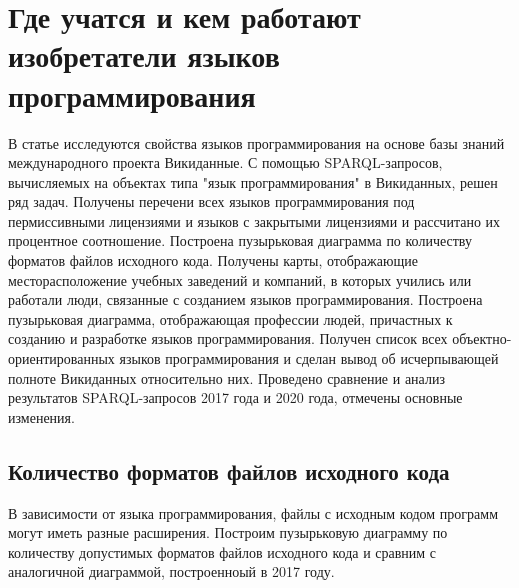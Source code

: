 \chapter{Где учатся и кем работают изобретатели языков программирования}
\label{ch:programming languages}

В статье исследуются свойства языков программирования на основе базы знаний международного проекта Викиданные. С помощью SPARQL-запросов, вычисляемых на объектах типа "язык программирования" в Викиданных, решен ряд задач. Получены перечени всех языков программирования под пермиссивными лицензиями и языков с закрытыми лицензиями и рассчитано их процентное соотношение. Построена пузырьковая диаграмма по количеству форматов файлов исходного кода. Получены карты, отображающие месторасположение учебных заведений и компаний, в которых учились или работали люди, связанные с созданием языков программирования. Построена пузырьковая диаграмма, отображающая профессии людей, причастных к созданию и разработке языков программирования. Получен список всех объектно-ориентированных языков программирования и сделан вывод об исчерпывающей полноте Викиданных относительно них. Проведено сравнение и анализ результатов SPARQL-запросов 2017 года и 2020 года, отмечены основные изменения. 

\section{Количество форматов файлов исходного кода}

В зависимости от языка программирования, файлы с исходным кодом программ могут иметь разные расширения. Построим пузырьковую диаграмму по количеству допустимых форматов файлов исходного кода и сравним с аналогичной диаграммой, построенноый в 2017 году.

%

